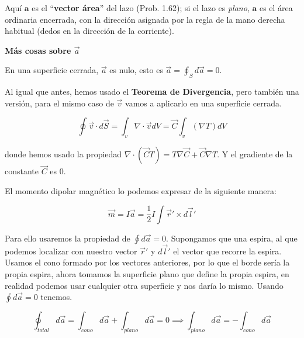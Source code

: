 \documentclass[12pt,a4paper]{report}
\newcommand{\esp}{\vspace{0.5cm}}
\begin{document}
	Aquí $\mathbf{a}$ es el ``\textbf{vector área}'' del lazo (Prob. 1.62); si el lazo es \textit{plano}, $\mathbf{a}$ es el área ordinaria encerrada, con la dirección asignada por la regla de la mano derecha habitual (dedos en la dirección de la corriente).
	
	\esp
	
	\noindent \textbf{Más cosas sobre $\vec{a}$}
	
	\esp
	
	\noindent En una superficie cerrada, $\vec{a}$ es nulo, esto es $\vec{a} = \oint_S d\vec{a} = 0$. 

	\esp
	
	\begin{nota}
		Al igual que antes, hemos usado el \textbf{Teorema de Divergencia}, pero también una versión, para el mismo caso de $\vec{v}$ vamos a aplicarlo en una superficie cerrada.
		
		\esp
		
		\begin{equation}
			\oint \vec{v} \cdot d\vec{S} = \int_v \nabla \cdot \vec{v} dV = \vec{C} \int_v (\nabla T) dV
		\end{equation}
		
		\esp
		
		donde hemos usado la propiedad $\nabla \cdot (\vec{C}T) = T \nabla \vec{C} + \vec{C} \nabla T$. Y el gradiente de la constante $\vec{C}$ es 0.
	\end{nota}
	
	\esp
	
	\noindent El momento dipolar magnético lo podemos expresar de la siguiente manera:
	
	\begin{equation}
		\vec{m} = I \vec{a} = \frac{1}{2} I \int \vec{r}' \times d\vec{l}'
	\end{equation}

	\esp
	
	Para ello usaremos la propiedad de $\oint d\vec{a} = 0$. Supongamos que una espira, al que podemos localizar con nuestro vector $\vec{r}'$ y $d\vec{l}'$ el vector que recorre la espira. Usamos el cono formado por los vectores anteriores, por lo que el borde sería la propia espira, ahora tomamos la superficie plano que define la propia espira, en realidad podemos usar cualquier otra superficie y nos daría lo mismo. Usando $\oint d\vec{a}=0$ tenemos.
	
	\esp
	
	\begin{equation}
		\oint_{total} d\vec{a} = \int_{cono} d\vec{a} + \int_{plano} d\vec{a} = 0 \implies \int_{plano} d\vec{a} = - \int_{cono} d\vec{a}
	\end{equation}
\end{document}
